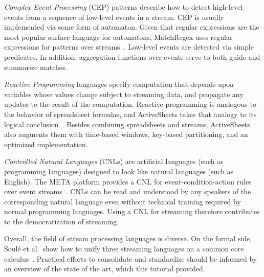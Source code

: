 \emph{Complex Event Processing} (CEP) patterns describe how to detect
high-level events from a sequence of low-level events in a
stream. CEP is usually implemented via some form of automaton. Given
that regular expressions are the most popular surface language for
automatons, Match\-Regex uses regular expressions for patterns over
streams~\cite{hirzel_2012}. Low-level events are detected via simple
predicates. In addition, aggregation functions over events serve to
both guide and summarize matches.

\emph{Reactive Programming} languages specify computation that depends
upon variables whose values change subject to streaming data, and
propagate any updates to the result of the computation. Reactive
programming is analogous to the behavior of spreadsheet formulas, and
ActiveSheets takes that analogy to its logical
conclusion~\cite{hirzel_et_al_2016}. Besides combining spreadsheets
and streams, ActiveSheets also augments them with time-based windows,
key-based partitioning, and an optimized implementation.

\emph{Controlled Natural Languages} (CNLs) are artificial languages
(such as programming languages) designed to look like natural
languages (such as English).  The META platform provides a CNL for
event-condition-action rules over event
streams~\cite{arnold_et_al_2016}. CNLs can be read and understood by
any speakers of the corresponding natural language even without
technical training required by normal programming languages. Using a
CNL for streaming therefore contributes to the democratization of
streaming.

Overall, the field of stream processing languages is diverse.  On the
formal side, Soul\'{e} et al.\ show how to unify three streaming languages
on a common core calculus~\cite{soule_et_al_2016}. Practical efforts
to consolidate and standardize should be informed by an overview of
the state of the art, which this tutorial provided.
